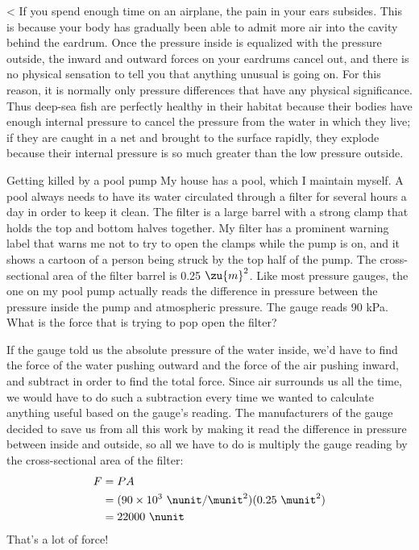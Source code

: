 <%
If you spend enough time on an airplane,
the pain in your ears subsides. This is because your body
has gradually been able to admit more air into the cavity
behind the eardrum. Once the pressure inside is equalized
with the pressure outside, the inward and outward forces on
your eardrums cancel out, and there is no physical sensation
to tell you that anything unusual is going on. For this
reason, it is normally only pressure differences that have
any physical significance. Thus deep-sea fish are perfectly
healthy in their habitat because their bodies have enough
internal pressure to cancel the pressure from the water in
which they live; if they are caught in a net and brought to
the surface rapidly, they explode because their internal
pressure is so much greater than the low pressure outside.

\begin{eg}{Getting killed by a pool pump}
\egquestion
My house has a pool, which I maintain myself. A
pool always needs to have its water circulated through a
filter for several hours a day in order to keep it clean.
The filter is a large barrel with a strong clamp that holds
the top and bottom halves together. My filter has a
prominent warning label that warns me not to try to open the
clamps while the pump is on, and it shows a cartoon of a
person being struck by the top half of the pump. The
cross-sectional area of the filter barrel is 0.25 $\zu{m}^2$. Like
most pressure gauges, the one on my pool pump actually reads
the difference in pressure between the pressure inside the
pump and atmospheric pressure. The gauge reads 90 kPa. What
is the force that is trying to pop open the filter?

\eganswer
If the gauge told us the absolute pressure of the
water inside, we'd have to find the force of the water
pushing outward and the force of the air pushing inward, and
subtract in order to find the total force. Since air
surrounds us all the time, we would have to do such a
subtraction every time we wanted to calculate anything
useful based on the gauge's reading. The manufacturers of
the gauge decided to save us from all this work by making it
read the difference in pressure between inside and outside,
so all we have to do is multiply the gauge reading by the
cross-sectional area of the filter:
\begin{align*}
         F         &=  PA\\
                &=  (90\times10^3\ \nunit/\munit^2)( 0.25\ \munit^2)\\        
               &= 22000\ \nunit
\end{align*}
That's a lot of force!
\end{eg}

